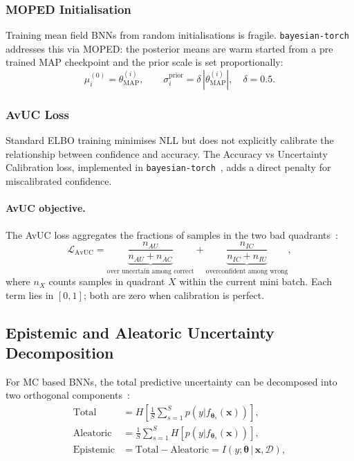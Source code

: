 \documentclass[conference]{IEEEtran}
\newcommand{\btheta}{\bm{\theta}}
\newcommand{\cD}{\mathcal{D}}
\newcommand{\MAP}{\text{MAP}}
\begin{document}
\subsubsection{MOPED Initialisation}

Training mean field BNNs from random initialisations is fragile.
\texttt{bayesian-torch}~\citep{intel2021bayesiantorch} addresses this via
MOPED: the posterior means are warm started from a
pre trained MAP checkpoint and the prior scale is set proportionally:
\begin{equation}
  \mu_i^{(0)} = \theta_{\MAP}^{(i)}, \qquad
  \sigma_i^{\text{prior}} = \delta\,|\theta_{\MAP}^{(i)}|, \quad \delta=0.5.
\end{equation}

\subsubsection{AvUC Loss}
\label{sec:theory:avuc}

Standard ELBO training minimises NLL but does not explicitly calibrate the
relationship between confidence and accuracy.
The
Accuracy vs Uncertainty Calibration loss, implemented in
\texttt{bayesian-torch}~\citep{intel2021bayesiantorch}, adds a direct
penalty for miscalibrated confidence.

\paragraph{AvUC objective.}
The AvUC loss aggregates the fractions of samples in the two
bad quadrants~\citep{intel2021bayesiantorch}:
\begin{equation}
  \mathcal{L}_{\mathrm{AvUC}}
    = \underbrace{\frac{n_{AU}}{n_{AU}+n_{AC}}}_{\text{over uncertain among correct}}
    + \underbrace{\frac{n_{IC}}{n_{IC}+n_{IU}}}_{\text{overconfident among wrong}},
  \label{eq:avuc}
\end{equation}
where $n_X$ counts samples in quadrant $X$ within the current mini batch.
Each term lies in $[0,1]$; both are zero when calibration is perfect.

\subsection{Epistemic and Aleatoric Uncertainty Decomposition}
\label{sec:theory:unc_decomp}

For MC based BNNs, the total predictive uncertainty can be decomposed into
two orthogonal components~\citep{goan2020bayesian}:
\begin{align}
  \text{Total}   &= H\!\left[\frac{1}{S}\sum_{s=1}^{S} p(y|f_{\btheta_s}(\bm{x}))\right], \\
  \text{Aleatoric}&= \frac{1}{S}\sum_{s=1}^{S} H\!\left[p(y|f_{\btheta_s}(\bm{x}))\right], \\
  \text{Epistemic}&= \text{Total} - \text{Aleatoric}
    = I\!\left(y;\btheta\,|\,\bm{x},\cD\right),
  \label{eq:mi}
\end{align}
\end{document}
